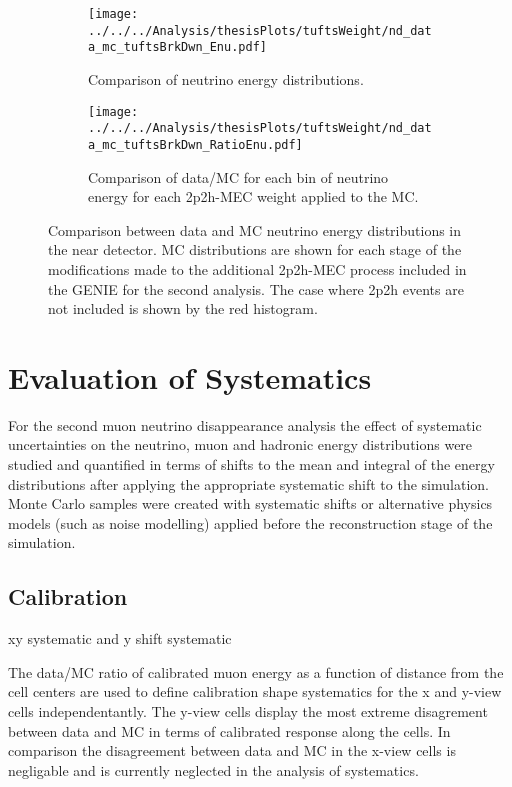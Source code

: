 \begin{figure}
\centering
   \begin{subfigure}[b]{0.9\textwidth}
\texttt{[image: ../../../Analysis/thesisPlots/tuftsWeight/nd\_data\_mc\_tuftsBrkDwn\_Enu.pdf]}
   \caption{Comparison of neutrino energy distributions.}
   \label{fig:tuftsWeight_nuE} 
\end{subfigure}
\begin{subfigure}[b]{0.9\textwidth}
\texttt{[image: ../../../Analysis/thesisPlots/tuftsWeight/nd\_data\_mc\_tuftsBrkDwn\_RatioEnu.pdf]}
   \caption{Comparison of data/MC for each bin of neutrino energy for
     each 2p2h-MEC weight applied to the MC.}
   \label{fig:tuftsWeight_nuERatio}
\end{subfigure}
\caption[]{Comparison between data and MC neutrino energy
  distributions in the near detector. MC distributions are shown for
  each stage of the modifications made to the additional 2p2h-MEC
  process included in the GENIE for the second analysis. The case
  where 2p2h events are not included is shown by the red histogram. }
\end{figure}

\section{Evaluation of Systematics}\label{sec:systs}

For the second muon neutrino disappearance analysis the effect of
systematic uncertainties on the neutrino, muon and hadronic energy
distributions were studied and quantified in terms of shifts to the
mean and integral of the energy distributions after applying the
appropriate systematic shift to the simulation.
Monte Carlo samples were created with systematic shifts or alternative
physics models (such as noise modelling) applied before the
reconstruction stage of the simulation.



\subsection{Calibration}\label{sec:calibsysts}
xy systematic and y shift systematic

The data/MC ratio of calibrated muon energy as a function of distance
from the cell centers are used to define calibration shape
systematics for the x and y-view cells independentantly. 
The y-view cells display the most extreme disagrement between data and
MC in terms of calibrated response along the cells. In comparison the
disagreement between data and MC in the x-view cells is negligable and
is currently neglected in the analysis of systematics\cite{dianaAbsCal}.

